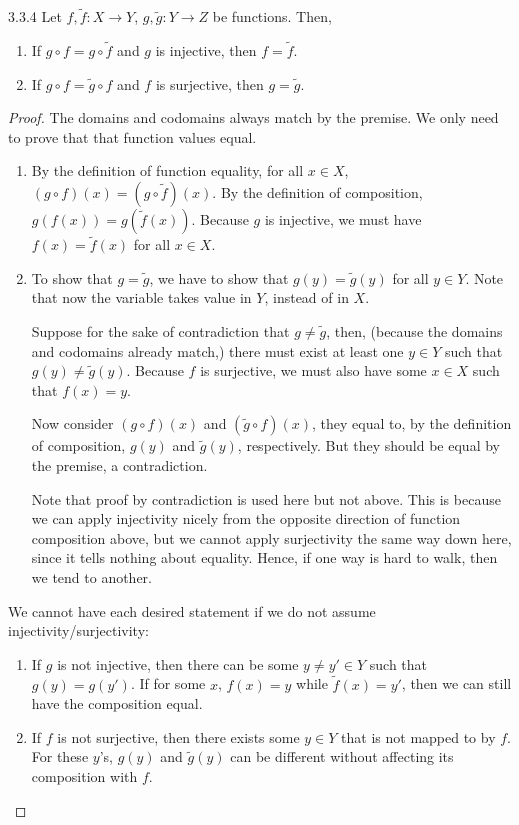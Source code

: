 \begin{exercise}{3.3.4}
	Let $f,\tilde{f}: X \to Y$, $g,\tilde{g}: Y \to Z$ be functions. Then,
	\begin{enumerate}
		\item If $g \circ f = g \circ \tilde{f}$ and $g$ is injective, then $f = \tilde{f}$.
		\item If $g \circ f = \tilde{g} \circ f$ and $f$ is surjective, then $g = \tilde{g}$.
	\end{enumerate}
\end{exercise}
\begin{proof}\leavevmode
	The domains and codomains always match by the premise. We only need to prove that that function values equal.
	\begin{enumerate}
		\item By the definition of function equality, for all $x \in X$, $(g \circ f)(x) = (g \circ \tilde{f})(x)$. By the definition of composition, $g(f(x)) = g(\tilde{f}(x))$. Because $g$ is injective, we must have $f(x) = \tilde{f}(x)$ for all $x \in X$.
		
		\item To show that $g = \tilde{g}$, we have to show that $g(y) = \tilde{g}(y)$ for all $y \in Y$. Note that now the variable takes value in $Y$, instead of in $X$. 
		
		Suppose for the sake of contradiction that $g \ne \tilde{g}$, then, (because the domains and codomains already match,) there must exist at least one $y\in Y$ such that $g(y) \ne \tilde{g}(y)$. Because $f$ is surjective, we must also have some $x \in X$ such that $f(x) = y$. 
		
		Now consider $(g \circ f)(x)$ and $(\tilde{g}\circ f)(x)$, they equal to, by the definition of composition, $g(y)$ and $\tilde{g}(y)$, respectively. But they should be equal by the premise, a contradiction.
		
		Note that proof by contradiction is used here but not above. This is because we can apply injectivity nicely from the opposite direction of function composition above, but we cannot apply surjectivity  the same way down here, since it tells nothing about equality. Hence, if one way is hard to walk, then we tend to another.
	\end{enumerate}

	We cannot have each desired statement if we do not assume injectivity/\discretionary{}{}{}surjectivity:
	\begin{enumerate}
		\item If $g$ is not injective, then there can be some $y \ne y' \in Y$ such that $g(y) = g(y')$. If for some $x$, $f(x) = y$ while $\tilde{f}(x) = y'$, then we can still have the composition equal.
		
		\item If $f$ is not surjective, then there exists some $y \in Y$ that is not mapped to by $f$. For these $y$'s, $g(y)$ and $\tilde{g}(y)$ can be different without affecting its composition with $f$.
	\end{enumerate}
\end{proof}

